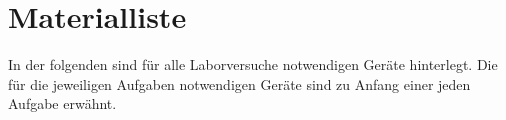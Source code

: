 \documentclass[11pt, 
                toc=listof, 
                toc=bibliography, 
                footnotes=multiple, 
                parskip=half, 
                numbers=noendperiod,
                ngerman
            ]{scrartcl}
\begin{document}







\begingroup
\hypersetup{linkcolor=black}
\tableofcontents
\clearpage

\listoffigures


\listoftables
\clearpage

% 


\endgroup

\setcounter{page}{1}

\section{Materialliste}
In der folgenden  sind für alle Laborversuche notwendigen Geräte hinterlegt. 
Die für die jeweiligen Aufgaben notwendigen Geräte sind zu Anfang einer jeden Aufgabe erwähnt.








\clearpage
\nocite{*}


% 
\end{document}
